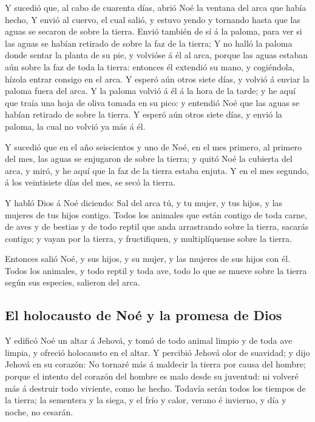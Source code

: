 Y sucedió que, al cabo de cuarenta días, abrió Noé la
ventana del arca que había hecho,  Y envió al cuervo, el
cual salió, y estuvo yendo y tornando hasta que las aguas se secaron de
sobre la tierra.  Envió también de sí á la paloma, para
ver si las aguas se habían retirado de sobre la faz de la tierra;
 Y no halló la paloma donde sentar la planta de su pie, y
volvióse á él al arca, porque las aguas estaban aún sobre la faz de toda
la tierra: entonces él extendió su mano, y cogiéndola, hízola entrar
consigo en el arca.  Y esperó aún otros siete días, y
volvió á enviar la paloma fuera del arca.  Y la paloma
volvió á él á la hora de la tarde; y he aquí que traía una hoja de oliva
tomada en su pico: y entendió Noé que las aguas se habían retirado de
sobre la tierra.  Y esperó aún otros siete días, y envió
la paloma, la cual no volvió ya más á él.

 Y sucedió que en el año seiscientos y uno de Noé, en el
mes primero, al primero del mes, las aguas se enjugaron de sobre la
tierra; y quitó Noé la cubierta del arca, y miró, y he aquí que la faz
de la tierra estaba enjuta.  Y en el mes segundo, á los
veintisiete días del mes, se secó la tierra.

 Y habló Dios á Noé diciendo:  Sal del
arca tú, y tu mujer, y tus hijos, y las mujeres de tus hijos contigo.
 Todos los animales que están contigo de toda carne, de
aves y de bestias y de todo reptil que anda arrastrando sobre la tierra,
sacarás contigo; y vayan por la tierra, y fructifiquen, y multiplíquense
sobre la tierra.

 Entonces salió Noé, y sus hijos, y su mujer, y las
mujeres de sus hijos con él.  Todos los animales, y todo
reptil y toda ave, todo lo que se mueve sobre la tierra según sus
especies, salieron del arca.

\hypertarget{el-holocausto-de-nouxe9-y-la-promesa-de-dios}{%
\subsection{El holocausto de Noé y la promesa de
Dios}\label{el-holocausto-de-nouxe9-y-la-promesa-de-dios}}

 Y edificó Noé un altar á Jehová, y tomó de todo animal
limpio y de toda ave limpia, y ofreció holocausto en el altar.
 Y percibió Jehová olor de suavidad; y dijo Jehová en su
corazón: No tornaré más á maldecir la tierra por causa del hombre;
porque el intento del corazón del hombre es malo desde su juventud: ni
volveré más á destruir todo viviente, como he hecho. 
Todavía serán todos los tiempos de la tierra; la sementera y la siega, y
el frío y calor, verano é invierno, y día y noche, no cesarán.

